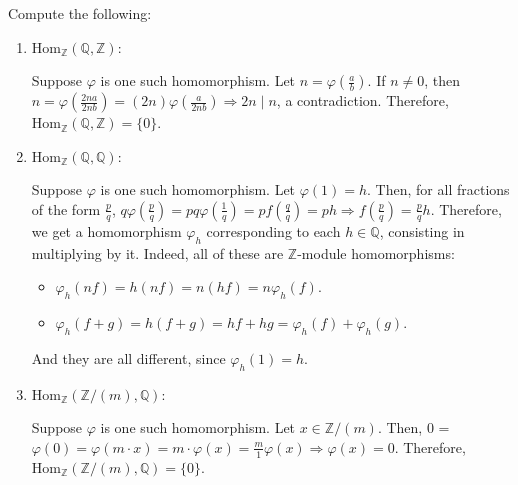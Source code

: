 \begin{problem}
    Compute the following:

    \begin{enumerate}[label=(\theproblem.\arabic*),ref=\theproblem.\arabic*]
        \item $\text{Hom}_{\mathbb{Z}}(\mathbb{Q}, \mathbb{Z})$:
        \begin{sol}
            Suppose $\varphi$ is one such homomorphism.
            Let $n = \varphi\left(\frac{a}{b}\right)$.
            If $n \neq 0$, then $n = \varphi\left(\frac{2na}{2nb}\right) = (2n)\varphi\left(\frac{a}{2nb}\right) \Rightarrow 2n \mid n$, a contradiction.
            Therefore, $\text{Hom}_{\mathbb{Z}}(\mathbb{Q}, \mathbb{Z}) = \{0\}$.
        \end{sol}

        \item $\text{Hom}_{\mathbb{Z}}(\mathbb{Q}, \mathbb{Q})$:
            \begin{sol}
                Suppose $\varphi$ is one such homomorphism.
                Let $\varphi(1) = h$.
                Then, for all fractions of the form $\frac{p}{q}$,
                $q\varphi\left(\frac{p}{q}\right) = pq \varphi\left(\frac{1}{q}\right) = p f\left(\frac{q}{q}\right) = ph \Rightarrow
                f\left(\frac{p}{q}\right) = \frac{p}{q}h$.
                Therefore, we get a homomorphism $\varphi_h$ corresponding to each $h\in \mathbb{Q}$, consisting in multiplying by it.
                Indeed, all of these are $\mathbb{Z}$-module homomorphisms:
                \begin{itemize}
                    \item $\varphi_h(nf) = h(nf) = n(hf) = n\varphi_h(f)$.
                    \item $\varphi_h(f+g) = h(f+g) = hf + hg = \varphi_h(f) + \varphi_h(g)$.
                \end{itemize}
                And they are all different, since $\varphi_h(1) = h$.
            \end{sol}
        \item $\text{Hom}_{\mathbb{Z}}(\mathbb{Z}/(m), \mathbb{Q})$:
            \begin{sol}
                Suppose $\varphi$ is one such homomorphism.
                Let $x \in \mathbb{Z}/(m)$.
                Then, 0 = $\varphi(0) = \varphi(m \cdot x) = m\cdot \varphi(x) = \frac{m}{1}\varphi(x) \Rightarrow \varphi(x) = 0$.
                Therefore, $\text{Hom}_{\mathbb{Z}}(\mathbb{Z}/(m), \mathbb{Q}) = \{0\}$.

            \end{sol}
    \end{enumerate}
\end{problem}